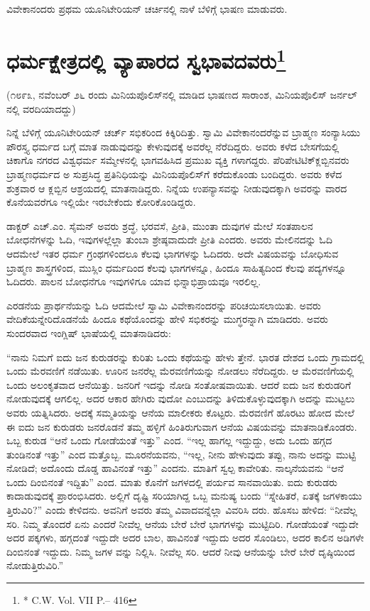 ವಿವೇಕಾನಂದರು ಪ್ರಥಮ ಯೂನಿಟೇರಿಯನ್​ ಚರ್ಚಿನಲ್ಲಿ ನಾಳೆ ಬೆಳಿಗ್ಗೆ ಭಾಷಣ ಮಾಡುವರು.

\delimiter


\section[ಧರ್ಮಕ್ಷೇತ್ರದಲ್ಲಿ ವ್ಯಾಪಾರದ ಸ್ವಭಾವದವರು]{ಧರ್ಮಕ್ಷೇತ್ರದಲ್ಲಿ ವ್ಯಾಪಾರದ ಸ್ವಭಾವದವರು\protect\footnote{* C.W. Vol. VII P.– 416}}

(೧೮೯೩, ನವೆಂಬರ್​ ೨೬ ರಂದು ಮಿನಿಯಪೊಲಿಸ್​ನಲ್ಲಿ ಮಾಡಿದ ಭಾಷಣದ ಸಾರಾಂಶ, ಮಿನಿಯಪೊಲಿಸ್​ ಜರ್ನಲ್​ನಲ್ಲಿ ವರದಿಯಾದದ್ದು)

ನಿನ್ನೆ ಬೆಳಿಗ್ಗೆ ಯೂನಿಟೇರಿಯನ್​ ಚರ್ಚ್​ ಸಭಿಕರಿಂದ ಕಿಕ್ಕಿರಿದಿತ್ತು. ಸ್ವಾಮಿ ವಿವೇಕಾನಂದರೆನ್ನುವ ಬ್ರಾಹ್ಮಣ ಸಂನ್ಯಾಸಿಯು ಪೌರಸ್ತ್ಯ ಧರ್ಮದ ಬಗ್ಗೆ ಮಾತ ನಾಡುವುದನ್ನು ಕೇಳುವುದಕ್ಕೆ ಅವರೆಲ್ಲ ನೆರೆದಿದ್ದರು. ಅವರು ಕಳೆದ ಬೇಸಗೆಯಲ್ಲಿ ಚಿಕಾಗೊ ನಗರದ ವಿಶ್ವಧರ್ಮ ಸಮ್ಮೇಳನಲ್ಲಿ ಭಾಗವಹಿಸಿದ ಪ್ರಮುಖ ವ್ಯಕ್ತಿ ಗಳಾಗದ್ದರು. ಪೆರಿಪೇಟಿಟಿಕ್​ ಕ್ಲಬ್ಬಿನವರು ಬ್ರಾಹ್ಮಣಧರ್ಮದ ಅ ಸುಪ್ರಸಿದ್ಧ ಪ್ರತಿನಿಧಿಯನ್ನು ಮಿನಿಯಪೊಲಿಸ್​ಗೆ ಕರೆದುಕೊಂಡು ಬಂದಿದ್ದರು. ಅವರು ಕಳೆದ ಶುಕ್ರವಾರ ಆ ಕ್ಲಬ್ಬಿನ ಆಶ್ರಯದಲ್ಲಿ ಮಾತನಾಡಿದ್ದರು. ನಿನ್ನೆಯ ಉಪನ್ಯಾಸವನ್ನು ನೀಡುವುದಕ್ಕಾಗಿ ಅವರನ್ನು ವಾರದ ಕೊನೆಯವರೆಗೂ ಇಲ್ಲಿಯೇ ಇರಬೇಕೆಂದು ಕೋರಿಕೊಂಡಿದ್ದರು.

ಡಾಕ್ಟರ್​ ಎಚ್​.ಎಂ. ಸೈಮನ್​ ಅವರು ಶ್ರದ್ಧೆ, ಭರವಸೆ, ಪ್ರೀತಿ, ಮುಂತಾ ದುವುಗಳ ಮೇಲೆ ಸಂತಪಾಲನ ಬೋಧನೆಗಳನ್ನು ಓದಿ, ಇವುಗಳಲ್ಲೆಲ್ಲಾ ತುಂಬಾ ಶ್ರೇಷ್ಠವಾದುದೇ ಪ್ರೀತಿ ಎಂದರು. ಅವರು ಮೇಲಿನದನ್ನು ಓದಿ ಆದಮೇಲೆ ಇತರ ಧರ್ಮ ಗ್ರಂಥಗಳಿಂದಲೂ ಕೆಲವು ಭಾಗಗಳನ್ನು ಓದಿದರು. ಅದೇ ವಿಷಯವನ್ನು ಬೋಧಿಸುವ ಬ್ರಾಹ್ಮಣ ಶಾಸ್ತ್ರಗಳಿಂದ, ಮುಸ್ಲಿಂ ಧರ್ಮದಿಂದ ಕೆಲವು ಭಾಗಗಳನ್ನೂ, ಹಿಂದೂ ಸಾಹಿತ್ಯದಿಂದ ಕೆಲವು ಪದ್ಯಗಳನ್ನೂ ಓದಿದರು. ಪಾಲನ ಬೋಧನೆಗೂ ಇವುಗಳಿಗೂ ಯಾವ ಭಿನ್ನಾಭಿಪ್ರಾಯವೂ ಇರಲಿಲ್ಲ.

ಎರಡನೆಯ ಪ್ರಾರ್ಥನೆಯನ್ನು ಓದಿ ಆದಮೇಲೆ ಸ್ವಾಮಿ ವಿವೇಕಾನಂದರನ್ನು ಪರಿಚಯಿಸಲಾಯಿತು. ಅವರು ವೇದಿಕೆಯನ್ನೇರಿದೊಡನೆಯೆ ಹಿಂದೂ ಕಥೆಯೊಂದನ್ನು ಹೇಳಿ ಸಭಿಕರನ್ನು ಮುಗ್ಧರನ್ನಾಗಿ ಮಾಡಿದರು. ಅವರು ಸುಂದರವಾದ ಇಂಗ್ಲಿಷ್​ ಭಾಷೆಯಲ್ಲಿ ಮಾತನಾಡಿದರು:

“ನಾನು ನಿಮಗೆ ಐದು ಜನ ಕುರುಡರನ್ನು ಕುರಿತು ಒಂದು ಕಥೆಯನ್ನು ಹೇಳು ತ್ತೇನೆ. ಭಾರತ ದೇಶದ ಒಂದು ಗ್ರಾಮದಲ್ಲಿ ಒಂದು ಮೆರವಣಿಗೆ ನಡೆಯಿತು. ಊರಿನ ಜನರೆಲ್ಲ ಮೆರವಣಿಗೆಯನ್ನು ನೋಡಲು ನೆರೆದಿದ್ದರು. ಆ ಮೆರವಣಿಗೆಯಲ್ಲಿ ಒಂದು ಅಲಂಕೃತವಾದ ಆನೆಯಿತ್ತು. ಜನರಿಗೆ ಇದನ್ನು ನೋಡಿ ಸಂತೋಷವಾಯಿತು. ಆದರೆ ಐದು ಜನ ಕುರುಡರಿಗೆ ನೋಡುವುದಕ್ಕೆ ಆಗಲಿಲ್ಲ. ಅದರ ಆಕಾರ ಹೇಗಿರು ವುದೋ ಎಂಬುದನ್ನು ತಿಳಿದುಕೊಳ್ಳುವುದಕ್ಕಾಗಿ ಅದನ್ನು ಮುಟ್ಟಲು ಅವರು ಯತ್ನಿಸಿದರು. ಅದಕ್ಕೆ ಸಮ್ಮತಿಯನ್ನು ಆನೆಯ ಮಾಲೀಕರು ಕೊಟ್ಟರು. ಮೆರವಣಿಗೆ ಹೊರಟು ಹೋದ ಮೇಲೆ ಈ ಐದು ಜನ ಕುರುಡರು ಜನರೊಡನೆ ತಮ್ಮ ಹಳ್ಳಿಗೆ ಹಿಂತಿರುಗುವಾಗ ಆನೆಯ ವಿಷಯವನ್ನು ಮಾತನಾಡಿಕೊಂಡರು. ಒಬ್ಬ ಕುರುಡ “ಆನೆ ಒಂದು ಗೋಡೆಯಂತೆ ಇತ್ತು” ಎಂದ. “ಇಲ್ಲ ಹಾಗಲ್ಲ ಇದ್ದುದ್ದು, ಅದು ಒಂದು ಹಗ್ಗದ ತುಂಡಿನಂತೆ ಇತ್ತು” ಎಂದ ಮತ್ತೊಬ್ಬ. ಮೂರನೆಯವನು, “ಇಲ್ಲ, ನೀನು ಹೇಳುವುದು ತಪ್ಪು, ನಾನು ಅದನ್ನು ಮುಟ್ಟಿ ನೋಡಿದೆ; ಅದೊಂದು ದೊಡ್ಡ ಹಾವಿನಂತೆ ಇತ್ತು” ಎಂದನು. ಮಾತಿಗೆ ಸ್ವಲ್ಪ ಕಾವೇರಿತು. ನಾಲ್ಕನೆಯವನು “ಆನೆ ಒಂದು ದಿಂಬಿನಂತೆ ಇದ್ದಿತು” ಎಂದ. ಮಾತು ಕೊನೆಗೆ ಜಗಳದಲ್ಲಿ ಪರ್ಯವ ಸಾನವಾಯಿತು. ಐದು ಕುರುಡರು ಕಾದಾಡುವುದಕ್ಕೆ ಪ್ರಾರಂಭಿಸಿದರು. ಅಲ್ಲಿಗೆ ದೃಷ್ಟಿ ಸರಿಯಾಗಿದ್ದ ಒಬ್ಬ ಮನುಷ್ಯ ಬಂದು “ಸ್ನೇಹಿತರೆ, ಏತಕ್ಕೆ ಜಗಳಕಾಯು ತ್ತಿರುವಿರಿ?” ಎಂದು ಕೇಳಿದನು. ಅವನಿಗೆ ಅವರು ತಮ್ಮ ವಿವಾದವನ್ನೆಲ್ಲಾ ವಿವರಿಸಿ ದರು. ಹೊಸಬ ಹೇಳಿದ: “ನೀವೆಲ್ಲ ಸರಿ. ನಿಮ್ಮ ತೊಂದರೆ ಏನು ಎಂದರೆ ನೀವೆಲ್ಲ ಆನೆಯ ಬೇರೆ ಬೇರೆ ಭಾಗಗಳನ್ನು ಮುಟ್ಟಿದಿರಿ. ಗೋಡೆಯಂತೆ ಇದ್ದುದೇ ಅದರ ಪಕ್ಕಗಳು, ಹಗ್ಗದಂತೆ ಇದ್ದುದೇ ಅದರ ಬಾಲ, ಹಾವಿನಂತೆ ಇದ್ದುದು ಅದರ ಸೊಂಡಿಲು, ಅದರ ಕಾಲಿನ ಅಡಿಗಳೇ ದಿಂಬಿನಂತೆ ಇದ್ದುದು. ನಿಮ್ಮ ಜಗಳ ವನ್ನು ನಿಲ್ಲಿಸಿ. ನೀವೆಲ್ಲ ಸರಿ. ಆದರೆ ನೀವು ಆನೆಯನ್ನು ಬೇರೆ ಬೇರೆ ದೃಷ್ಠಿಯಿಂದ ನೋಡುತ್ತಿರುವಿರಿ.”

